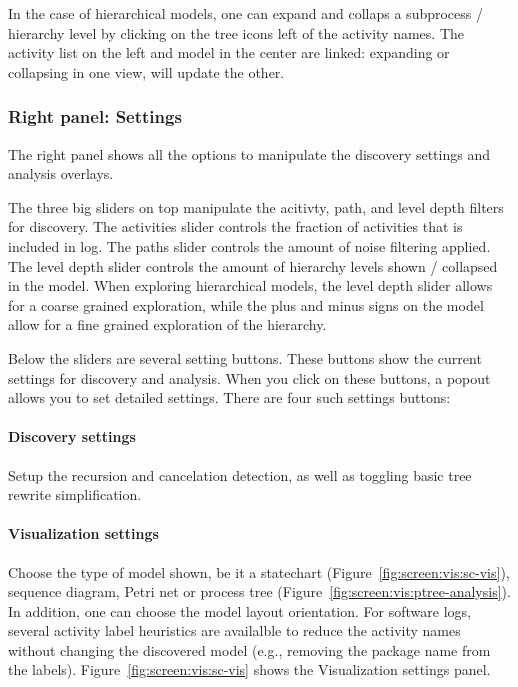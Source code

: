 \documentclass{article}
\begin{document}
In the case of hierarchical models, one can expand and collaps a subprocess / hierarchy 
level by clicking on the tree icons left of the activity names.
The activity list on the left and model in the center are linked:
expanding or collapsing in one view, will update the other.

\subsubsection{Right panel: Settings}
The right panel shows all the options to manipulate the discovery settings and analysis overlays.

The three big sliders on top manipulate the acitivty, path, and level depth filters for discovery.
The activities slider controls the fraction of activities that is included in log.
The paths slider controls the amount of noise filtering applied.
The level depth slider controls the amount of hierarchy levels shown / collapsed in the model.
When exploring hierarchical models, the level depth slider allows for a coarse grained exploration, 
while the plus and minus signs on the model allow for a fine grained exploration of the hierarchy.

Below the sliders are several setting buttons.
These buttons show the current settings for discovery and analysis.
When you click on these buttons, a popout allows you to set detailed settings.
There are four such settings buttons:

\paragraph{Discovery settings}
Setup the recursion and cancelation detection, as well as toggling basic tree rewrite simplification.

\paragraph{Visualization settings}
Choose the type of model shown, be it a statechart (Figure~\ref{fig:screen:vis:sc-vis}), 
sequence diagram, Petri net or process tree (Figure~\ref{fig:screen:vis:ptree-analysis}).
In addition, one can choose the model layout orientation.
For software logs, several activity label heuristics are availalble to reduce the activity names
without changing the discovered model (e.g., removing the package name from the labels).
Figure~\ref{fig:screen:vis:sc-vis} shows the Visualization settings panel.
\end{document}
